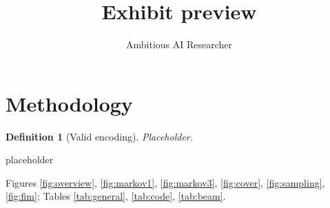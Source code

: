 \documentclass{article}
\title{Exhibit preview}
\author{Ambitious AI Researcher}
\newtheorem{definition}{Definition}
\begin{document}
\maketitle
\section{Methodology}\label{sec:method}
\begin{definition}[Valid encoding]\label{def:valid}Placeholder.\end{definition}
\begin{algorithm}[h]\caption{Cover encoding search (placeholder)}\label{alg:cover}
\begin{algorithmic}\STATE placeholder\end{algorithmic}\end{algorithm}
Figures \ref{fig:overview}, \ref{fig:markov1}, \ref{fig:markov3}, \ref{fig:cover},
\ref{fig:sampling}, \ref{fig:fim}; Tables \ref{tab:general}, \ref{tab:code}, \ref{tab:beam}.



\clearpage


\end{document}
